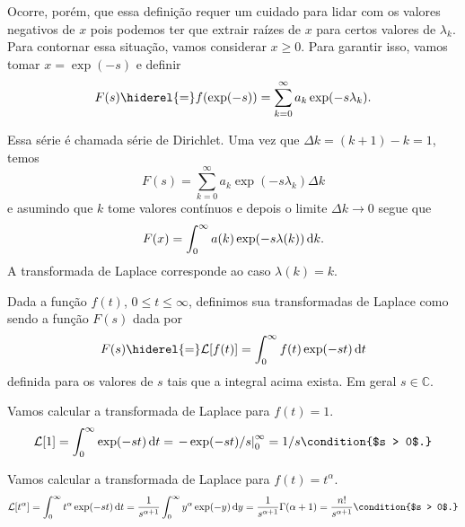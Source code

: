 Ocorre, porém, que essa definição requer um cuidado para lidar com os valores
negativos de $x$ pois podemos ter que extrair raízes de $x$ para certos valores
de $\lambda_k$. Para contornar essa situação, vamos considerar $x \geq 0$. Para
garantir isso, vamos tomar $x = \exp(-s)$ e definir
\begin{dmath*}
  F(s) \hiderel{=} f(\exp(-s)) = \sum_{k = 0}^{\infty} a_k \exp(-s \lambda_k).
\end{dmath*}

Essa série é chamada série de Dirichlet. Uma vez que $\Delta k = (k + 1) - k =
1$, temos
\begin{dmath*}
  F(s) = \sum_{k = 0}^{\infty} a_k \exp(-s \lambda_k) \Delta k
\end{dmath*}
e asumindo que $k$ tome valores contínuos e depois o limite $\Delta k \to 0$
segue que
\begin{dmath*}
  F(x) = \int_0^{\infty} a(k) \exp(-s \lambda(k)) \vi{k}.
\end{dmath*}
A transformada de Laplace corresponde ao caso $\lambda(k) = k$.

\begin{defi}
  Dada a função $f(t)$, $0 \leq t \leq \infty$, definimos sua transformadas de
  Laplace como sendo a função $F(s)$ dada por
  \begin{dmath*}
    F(s) \hiderel{=} \mathcal{L}[f(t)] = \int_0^{\infty} f(t) \exp(-s t) \vi{t}
  \end{dmath*}
  definida para os valores de $s$ tais que a integral acima exista. Em geral $s
  \in \mathbb{C}$.
\end{defi}

\begin{exem}
  Vamos calcular a transformada de Laplace para $f(t) = 1$.
  \begin{dmath*}
    \mathcal{L}[1] = \int_0^{\infty} \exp(-s t) \vi{t}
    = \left. - \exp(-s t) / s \right|_0^{\infty}
    = 1 / s \condition{$s > 0$.}
  \end{dmath*}
\end{exem}

\begin{exem}
  Vamos calcular a transformada de Laplace para $f(t) = t^{\alpha}$.
  \begin{dmath*}
    \mathcal{L}[t^{\alpha}] = \int_0^{\infty} t^{\alpha} \exp(-s t) \vi{t}
    = \frac{1}{s^{\alpha + 1}} \int_0^{\infty} y^{\alpha} \exp(-y) \vi{y}
    = \frac{1}{s^{\alpha + 1}} \Gamma(\alpha + 1)
    = \frac{n!}{s^{\alpha + 1}} \condition{$s > 0$.}
  \end{dmath*}
\end{exem}

